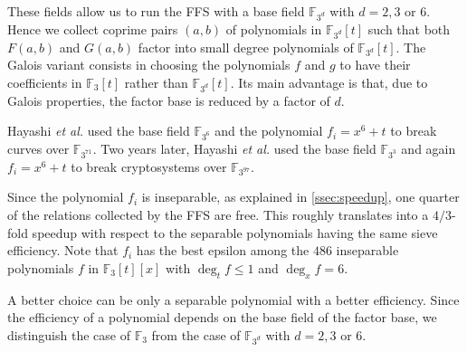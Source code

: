 \documentclass[a4wide]{article}
\newcommand{\F}{{\mathbb F}}
\theoremstyle{plain}
\theoremstyle{definition}
\theoremstyle{remark}
\begin{document}
These fields allow us to run the FFS with a base field $\F_{3^d}$ with
$d=2,3$ or $6$.  Hence we collect coprime pairs $(a,b)$ of polynomials
in $\F_{3^d}[t]$ such that both $F(a,b)$ and $G(a,b)$ factor into small
degree polynomials of $\F_{3^d}[t]$. The Galois variant
\cite{JoLe06} consists in choosing the polynomials $f$ and $g$ to have their
coefficients in $\F_3[t]$ rather than $\F_{3^d}[t]$. Its main advantage is
that, due to Galois properties, the factor base is reduced by a factor
of $d$.

Hayashi \textit{et al.} \cite{Japanese2010} used the base field $\F_{3^6}$
and the polynomial $f_i=x^6+t$ to break curves over $\F_{3^{71}}$. Two years
later, Hayashi \textit{et al.} \cite{Japanese2012} used the
base field $\F_{3^3}$ and again $f_i=x^6+t$ to break cryptosystems over
$\F_{3^{97}}$. 

Since the polynomial $f_i$ is inseparable, as explained in
\ref{ssec:speedup}, one quarter of the relations collected by the FFS are free. This roughly translates
into a $4/3$-fold speedup with respect to the separable polynomials having
the same sieve efficiency. Note that $f_i$ has the best epsilon among the
$486$ inseparable polynomials $f$ in $\F_3[t][x]$ with
$\deg_tf\leq 1$ and $\deg_xf=6$. 

A better choice can be only a separable polynomial with a
better efficiency. Since the efficiency of a polynomial depends on the base
field of the factor base, we distinguish the case of $\F_3$ from the case
of $\F_{3^d}$ with $d=2,3$ or $6$.
\end{document}
